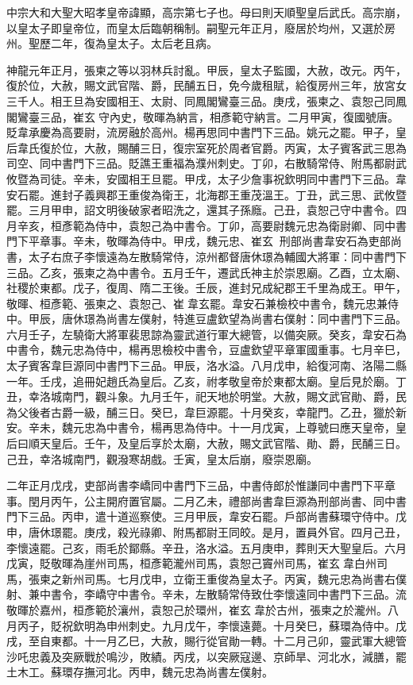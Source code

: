 \begin{pinyinscope}
 中宗大和大聖大昭孝皇帝諱顯，高宗第七子也。母曰則天順聖皇后武氏。高宗崩，以皇太子即皇帝位，而皇太后臨朝稱制。嗣聖元年正月，廢居於均州，又選於房州。聖歷二年，復為皇太子。太后老且病。



 神龍元年正月，張柬之等以羽林兵討亂。甲辰，皇太子監國，大赦，改元。丙午，復於位，大赦，賜文武官階、爵，民酺五日，免今歲租賦，給復房州三年，放宮女三千人。相王旦為安國相王、太尉、同鳳閣鸞臺三品。庚戌，張柬之、袁恕己同鳳閣鸞臺三品，崔玄守內史，敬暉為納言，相彥範守納言。二月甲寅，復國號唐。貶韋承慶為高要尉，流房融於高州。楊再思同中書門下三品。姚元之罷。甲子，皇后韋氏復於位，大赦，賜酺三日，復宗室死於周者官爵。丙寅，太子賓客武三思為司空、同中書門下三品。貶譙王重福為濮州刺史。丁卯，右散騎常侍、附馬都尉武攸暨為司徒。辛未，安國相王旦罷。甲戌，太子少詹事祝欽明同中書門下三品。韋安石罷。進封子義興郡王重俊為衛王，北海郡王重茂溫王。丁丑，武三思、武攸暨罷。三月甲申，詔文明後破家者昭洗之，還其子孫廕。己丑，袁恕己守中書令。四月辛亥，桓彥範為侍中，袁恕己為中書令。丁卯，高要尉魏元忠為衛尉卿、同中書門下平章事。辛未，敬暉為侍中。甲戌，魏元忠、崔玄，刑部尚書韋安石為吏部尚書，太子右庶子李懷遠為左散騎常侍，涼州都督唐休璟為輔國大將軍：同中書門下三品。乙亥，張柬之為中書令。五月壬午，遷武氏神主於崇恩廟。乙酉，立太廟、社稷於東都。戊子，復周、隋二王後。壬辰，進封兄成紀郡王千里為成王。甲午，敬暉、桓彥範、張柬之、袁恕己、崔韋玄罷。韋安石兼檢校中書令，魏元忠兼侍中。甲辰，唐休璟為尚書左僕射，特進豆盧欽望為尚書右僕射：同中書門下三品。六月壬子，左驍衛大將軍裴思諒為靈武道行軍大總管，以備突厥。癸亥，韋安石為中書令，魏元忠為侍中，楊再思檢校中書令，豆盧欽望平章軍國重事。七月辛巳，太子賓客韋巨源同中書門下三品。甲辰，洛水溢。八月戊申，給復河南、洛陽二縣一年。壬戌，追冊妃趙氏為皇后。乙亥，祔孝敬皇帝於東都太廟。皇后見於廟。丁丑，幸洛城南門，觀斗象。九月壬午，祀天地於明堂。大赦，賜文武官勛、爵，民為父後者古爵一級，酺三日。癸巳，韋巨源罷。十月癸亥，幸龍門。乙丑，獵於新安。辛未，魏元忠為中書令，楊再思為侍中。十一月戊寅，上尊號曰應天皇帝，皇后曰順天皇后。壬午，及皇后享於太廟，大赦，賜文武官階、勛、爵，民酺三日。己丑，幸洛城南門，觀潑寒胡戲。壬寅，皇太后崩，廢崇恩廟。



 二年正月戊戌，吏部尚書李嶠同中書門下三品，中書侍郎於惟謙同中書門下平章事。閏月丙午，公主開府置官屬。二月乙未，禮部尚書韋巨源為刑部尚書、同中書門下三品。丙申，遣十道巡察使。三月甲辰，韋安石罷。戶部尚書蘇環守侍中。戊申，唐休璟罷。庚戌，殺光祿卿、附馬都尉王同皎。是月，置員外官。四月己丑，李懷遠罷。己亥，雨毛於鄮縣。辛丑，洛水溢。五月庚申，葬則天大聖皇后。六月戊寅，貶敬暉為崖州司馬，桓彥範瀧州司馬，袁恕己竇州司馬，崔玄韋白州司馬，張柬之新州司馬。七月戊申，立衛王重俊為皇太子。丙寅，魏元忠為尚書右僕射、兼中書令，李嶠守中書令。辛未，左散騎常侍致仕李懷遠同中書門下三品。流敬暉於嘉州，桓彥範於瀼州，袁恕己於環州，崔玄韋於古州，張柬之於瀧州。八月丙子，貶祝欽明為申州刺史。九月戊午，李懷遠薨。十月癸巳，蘇環為侍中。戊戌，至自東都。十一月乙巳，大赦，賜行從官勛一轉。十二月己卯，靈武軍大總管沙吒忠義及突厥戰於鳴沙，敗績。丙戌，以突厥寇邊、京師旱、河北水，減膳，罷土木工。蘇環存撫河北。丙申，魏元忠為尚書左僕射。




\end{pinyinscope}
